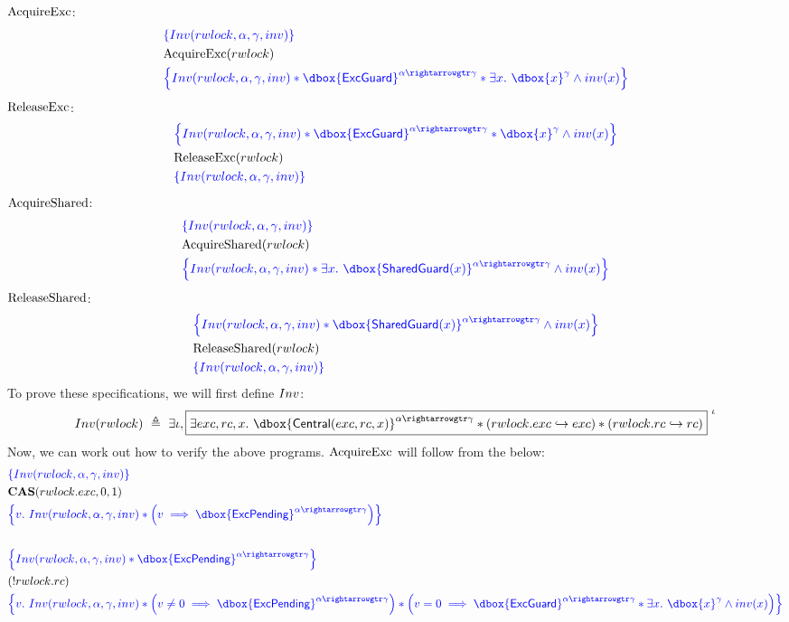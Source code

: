 \documentclass{article}
\newcommand\dboxed[1]{\dbox{\vphantom{t}\ensuremath{#1}}}
\renewcommand{\eqdef}{\triangleq}
\newcommand{\pointsto}{\hookrightarrow}
\newcommand{\refines}{\rightarrowgtr}
\begin{document}
$\text{AcquireExc}$:
\begin{align*}
& \inlinehoare{ \Inv(\rwlock,\alpha,\gamma,\inv) }\\
& \AcquireExc(\rwlock) \\
& \inlinehoare{ \Inv(\rwlock,\alpha,\gamma,\inv) * \dboxed{\ExcGuard}^{\alpha \refines \gamma} * \exists x.~ \dboxed{x}^\gamma \land \inv(x) }
\end{align*}
$\text{ReleaseExc}$:
\begin{align*}
& \inlinehoare{ \Inv(\rwlock,\alpha,\gamma,\inv) * \dboxed{\ExcGuard}^{\alpha \refines \gamma} * \dboxed{x}^\gamma \land \inv(x) }\\
& \ReleaseExc(\rwlock) \\
& \inlinehoare{ \Inv(\rwlock,\alpha,\gamma,\inv) }
\end{align*}
$\text{AcquireShared}$:
\begin{align*}
& \inlinehoare{ \Inv(\rwlock,\alpha,\gamma,\inv) }\\
& \AcquireShared(\rwlock) \\
& \inlinehoare{ \Inv(\rwlock,\alpha,\gamma,\inv) * \exists x.~ \dboxed{\SharedGuard(x)}^{\alpha \refines \gamma} \land \inv(x) }
\end{align*}
$\text{ReleaseShared}$:
\begin{align*}
& \inlinehoare{ \Inv(\rwlock,\alpha,\gamma,\inv) * \dboxed{\SharedGuard(x)}^{\alpha \refines \gamma} \land \inv(x) }\\
& \ReleaseShared(\rwlock) \\
& \inlinehoare{ \Inv(\rwlock,\alpha,\gamma,\inv) }
\end{align*}
To prove these specifications, we will first define $Inv$:
\begin{align*}
  \Inv(\rwlock) ~\eqdef~
      \exists \iota, \boxed{
        \exists exc,rc,x .~
            \dboxed{\Central(exc,rc,x)}^{\alpha \refines \gamma}
            * (\rwlock.\exc \pointsto exc)
            * (\rwlock.\rc \pointsto rc)
      }^{~\iota}
\end{align*}
Now, we can work out how to verify the above programs.
$\text{AcquireExc}$ will follow from the below:
\begin{align}
& \inlinehoare{ \Inv(\rwlock,\alpha,\gamma,\inv) } \nonumber \\
& \CAS(\rwlock.\exc,0,1) \nonumber \\ %
& \inlinehoare{v.~
  \Inv(\rwlock,\alpha,\gamma,\inv) *
      \left(v \implies \dboxed{\ExcPending}^{\alpha\refines\gamma}\right) } \nonumber \\
   \nonumber \\
& \inlinehoare{
    \Inv(\rwlock,\alpha,\gamma,\inv) *
    \dboxed{\ExcPending}^{\alpha\refines\gamma} } \nonumber \\
& (!\rwlock.\rc) \nonumber \\
& \inlinehoare{v .~
    \Inv(\rwlock,\alpha,\gamma,\inv) *
    \left(v\ne 0 \implies \dboxed{\ExcPending}^{\alpha\refines\gamma}\right) *
    \left(v=0 \implies \dboxed{\ExcGuard}^{\alpha\refines\gamma} *
        \exists x.~ \dboxed{x}^{\gamma} \land \inv(x)\right)
    } \nonumber
\end{align}
\end{document}
